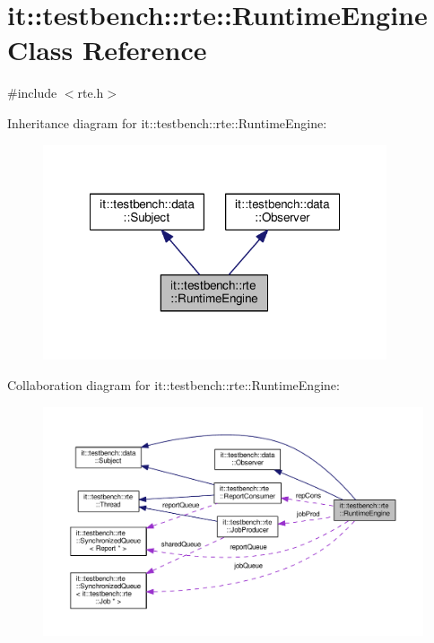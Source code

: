 \hypertarget{classit_1_1testbench_1_1rte_1_1RuntimeEngine}{\section{it\-:\-:testbench\-:\-:rte\-:\-:Runtime\-Engine Class Reference}
\label{d9/d54/classit_1_1testbench_1_1rte_1_1RuntimeEngine}
}


{\ttfamily \#include $<$rte.\-h$>$}



Inheritance diagram for it\-:\-:testbench\-:\-:rte\-:\-:Runtime\-Engine\-:
\nopagebreak
\begin{figure}[H]
\begin{center}
\leavevmode
\includegraphics[width=287pt]{db/d26/classit_1_1testbench_1_1rte_1_1RuntimeEngine__inherit__graph}
\end{center}
\end{figure}


Collaboration diagram for it\-:\-:testbench\-:\-:rte\-:\-:Runtime\-Engine\-:
\nopagebreak
\begin{figure}[H]
\begin{center}
\leavevmode
\includegraphics[width=350pt]{d5/dab/classit_1_1testbench_1_1rte_1_1RuntimeEngine__coll__graph}
\end{center}
\end{figure}
